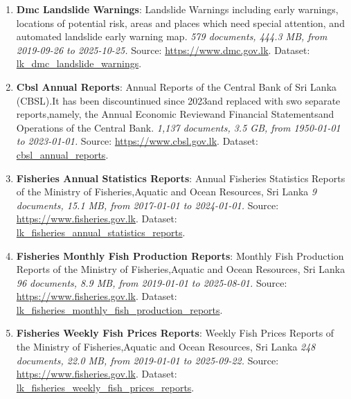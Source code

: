 \documentclass[10pt,a4paper]{article}%
\begin{document}
\begin{enumerate}
\item%
\textbf{Dmc Landslide Warnings}: Landslide Warnings including early warnings, locations of potential risk, areas and places which need special attention, and automated landslide early warning map.\textit{ 579 documents, 444.3 MB, from 2019{-}09{-}26 to 2025{-}10{-}25.} Source: \href{https://www.dmc.gov.lk}{https://www.dmc.gov.lk}. Dataset: \href{https://github.com/nuuuwan/lk\_dmc/tree/data\_lk\_dmc\_landslide\_warnings/data/lk\_dmc\_landslide\_warnings}{lk\_dmc\_landslide\_warnings}.%
\item%
\textbf{Cbsl Annual Reports}: Annual Reports of the Central Bank of Sri Lanka (CBSL).It has been discountinued since 2023and replaced with swo separate reports,namely, the Annual Economic Reviewand Financial Statementsand Operations of the Central Bank.\textit{ 1,137 documents, 3.5 GB, from 1950{-}01{-}01 to 2023{-}01{-}01.} Source: \href{https://www.cbsl.gov.lk}{https://www.cbsl.gov.lk}. Dataset: \href{https://github.com/nuuuwan/cbsl/tree/data\_cbsl\_annual\_reports/data/cbsl\_annual\_reports}{cbsl\_annual\_reports}.%
\item%
\textbf{Fisheries Annual Statistics Reports}: Annual Fisheries Statistics Reports of the Ministry of Fisheries,Aquatic and Ocean Resources, Sri Lanka\textit{ 9 documents, 15.1 MB, from 2017{-}01{-}01 to 2024{-}01{-}01.} Source: \href{https://www.fisheries.gov.lk}{https://www.fisheries.gov.lk}. Dataset: \href{https://github.com/nuuuwan/lk\_fisheries/tree/data\_lk\_fisheries\_annual\_statistics\_reports/data/lk\_fisheries\_annual\_statistics\_reports}{lk\_fisheries\_annual\_statistics\_reports}.%
\item%
\textbf{Fisheries Monthly Fish Production Reports}: Monthly Fish Production Reports of the Ministry of Fisheries,Aquatic and Ocean Resources, Sri Lanka\textit{ 96 documents, 8.9 MB, from 2019{-}01{-}01 to 2025{-}08{-}01.} Source: \href{https://www.fisheries.gov.lk}{https://www.fisheries.gov.lk}. Dataset: \href{https://github.com/nuuuwan/lk\_fisheries/tree/data\_lk\_fisheries\_monthly\_fish\_production\_reports/data/lk\_fisheries\_monthly\_fish\_production\_reports}{lk\_fisheries\_monthly\_fish\_production\_reports}.%
\item%
\textbf{Fisheries Weekly Fish Prices Reports}: Weekly Fish Prices Reports of the Ministry of Fisheries,Aquatic and Ocean Resources, Sri Lanka\textit{ 248 documents, 22.0 MB, from 2019{-}01{-}01 to 2025{-}09{-}22.} Source: \href{https://www.fisheries.gov.lk}{https://www.fisheries.gov.lk}. Dataset: \href{https://github.com/nuuuwan/lk\_fisheries/tree/data\_lk\_fisheries\_weekly\_fish\_prices\_reports/data/lk\_fisheries\_weekly\_fish\_prices\_reports}{lk\_fisheries\_weekly\_fish\_prices\_reports}.%

\end{enumerate}
\end{document}
